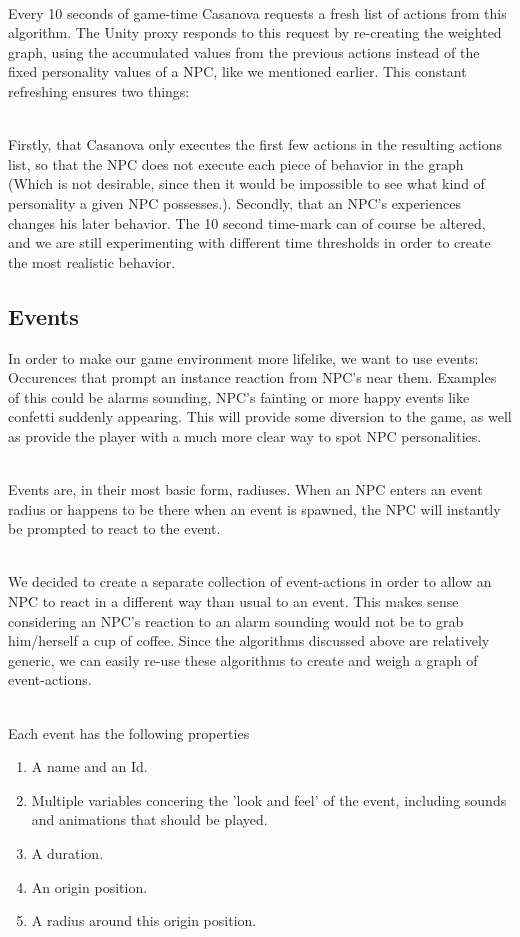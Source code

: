 \documentclass[11pt]{article} %
\begin{document}
~\\
Every 10 seconds of game-time Casanova requests a fresh list of actions from this algorithm. The Unity proxy responds to this request by re-creating the weighted graph, using the accumulated values from the previous actions instead of the fixed personality values of a NPC, like we mentioned earlier. This constant refreshing ensures two things: 

~\\
Firstly, that Casanova only executes the first few actions in the resulting actions list, so that the NPC does not execute each piece of behavior in the graph (Which is not desirable, since then it would be impossible to see what kind of personality a given NPC possesses.). 
Secondly, that an NPC's experiences changes his later behavior. %
The 10 second time-mark can of course be altered, and we are still experimenting with different time thresholds in order to create the most realistic behavior.


\newpage
\subsection{Events}
In order to make our game environment more lifelike, we want to use events: Occurences that prompt an instance reaction from NPC's near them. Examples of this could be alarms sounding, NPC's fainting or more happy events like confetti suddenly appearing. This will provide some diversion to the game, as well as provide the player with a much more clear way to spot NPC personalities.

~\\
Events are, in their most basic form, radiuses. When an NPC enters an event radius or happens to be there when an event is spawned, the NPC will instantly be prompted to react to the event.

~\\
We decided to create a separate collection of event-actions in order to allow an NPC to react in a different way than usual to an event. This makes sense considering an NPC's reaction to an alarm sounding would not be to grab him/herself a cup of coffee.
Since the algorithms discussed above are relatively generic, we can easily re-use these algorithms to create and weigh a graph of event-actions. 

~\\
Each event has the following properties 

\begin{enumerate}
\item A name and an Id.
\item Multiple variables concering the 'look and feel' of the event, including sounds and animations that should be played.
\item A duration.
\item An origin position.
\item A radius around this origin position.
\end{enumerate}
\end{document}
